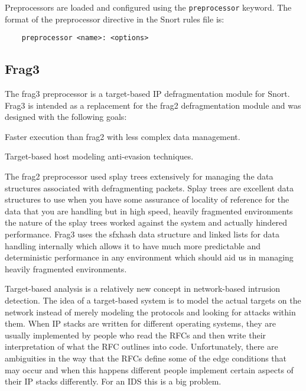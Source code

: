 \documentclass[english]{report}
\newcounter{slistnum}
\newenvironment{slist}
{ \begin{list}{ {\bf \arabic{slistnum}.} }{\usecounter{slistnum} } }
{ \end{list} }
\begin{document}
Preprocessors are loaded and configured using the {\tt preprocessor} keyword.
The format of the preprocessor directive in the Snort rules file is:

\begin{verbatim}
    preprocessor <name>: <options>
\end{verbatim}

\subsection{Frag3}
\label{frag3 section}

The frag3 preprocessor is a target-based IP defragmentation module for Snort.
Frag3 is intended as a replacement for the frag2 defragmentation module and was
designed with the following goals:

\begin{slist}
\item Faster execution than frag2 with less complex data management.
\item Target-based host modeling anti-evasion techniques.
\end{slist}

The frag2 preprocessor used splay trees extensively for managing the data
structures associated with defragmenting packets.  Splay trees are excellent
data structures to use when you have some assurance of locality of reference
for the data that you are handling but in high speed, heavily fragmented
environments the nature of the splay trees worked against the system and
actually hindered performance.  Frag3 uses the sfxhash data structure and
linked lists for data handling internally which allows it to have much more
predictable and deterministic performance in any environment which should aid
us in managing heavily fragmented environments.

Target-based analysis is a relatively new concept in network-based intrusion
detection.  The idea of a target-based system is to model the actual targets on
the network instead of merely modeling the protocols and looking for attacks
within them.  When IP stacks are written for different operating systems, they
are usually implemented by people who read the RFCs and then write their
interpretation of what the RFC outlines into code.  Unfortunately, there are
ambiguities in the way that the RFCs define some of the edge conditions that
may occur and when this happens different people implement certain aspects of
their IP stacks differently.  For an IDS this is a big problem.
\end{document}
